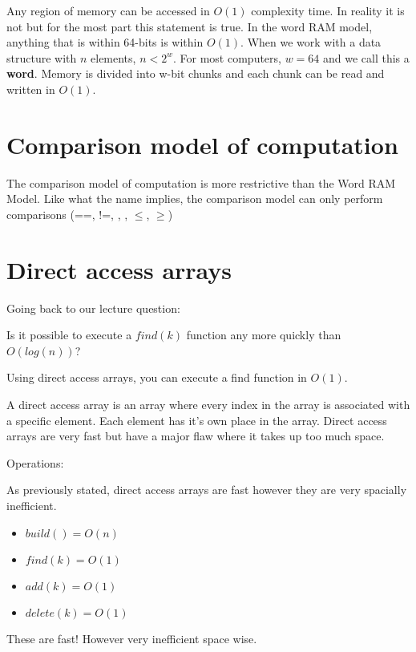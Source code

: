 \documentclass[11pt,a4paper,english]{report}
\begin{document}
Any region of memory can be accessed in $O(1)$ complexity time. In reality it is not but for the most part this statement is true. In the word RAM model, anything that is within 64-bits is within $O(1)$. When we work with a data structure with $n$ elements, $n < 2^{w}$. For most computers, $w = 64$ and we call this a \textbf{word}. Memory is divided into w-bit chunks and each chunk can be read and written in $O(1)$.

\section{Comparison model of computation}

The comparison model of computation is more restrictive than the Word RAM Model. Like what the name implies, the comparison model can only perform comparisons (==, !=, , , $\leq$, $\geq$)

\section{Direct access arrays}

Going back to our lecture question: 

\begin{gbox}{}{
    Is it possible to execute a $find(k)$ function any more quickly than $O(log(n))$?
}\end{gbox}

\noindent Using direct access arrays, you can execute a find function in $O(1)$.

\noindent A direct access array is an array where every index in the array is associated with a specific element. Each element has it's own place in the array. Direct access arrays are very fast but have a major flaw where it takes up too much space.

\bigskip
\begin{bluebox}{Operations:} {

    As previously stated, direct access arrays are fast however they are very spacially inefficient.

    \begin{itemize}

    \item $build() = O(n)$
    \item $find(k) = O(1)$
    \item $add(k) = O(1)$
    \item $delete(k) = O(1)$

    \end{itemize}

    These are fast! However very inefficient space wise.


}\end{bluebox}
\end{document}
